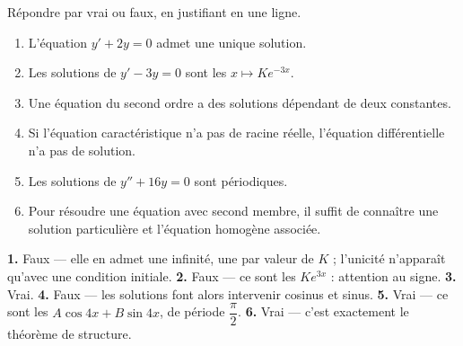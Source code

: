 \begin{jemeteste}
Répondre par vrai ou faux, en justifiant en une ligne.

\begin{enumerate}[label=\textbf{\arabic*.}, leftmargin=*, itemsep=0.28em]
  \item L'équation $y'+2y = 0$ admet une unique solution.
  \item Les solutions de $y'-3y=0$ sont les $x \mapsto Ke^{-3x}$.
  \item Une équation du second ordre a des solutions dépendant de deux
        constantes.
  \item Si l'équation caractéristique n'a pas de racine réelle, l'équation
        différentielle n'a pas de solution.
  \item Les solutions de $y''+16y = 0$ sont périodiques.
  \item Pour résoudre une équation avec second membre, il suffit de connaître
        une solution particulière et l'équation homogène associée.
\end{enumerate}
\end{jemeteste}

\begin{corrige}[je me teste]
\textbf{1.} Faux — elle en admet une infinité, une par valeur de $K$ ; l'unicité
n'apparaît qu'avec une condition initiale.
\textbf{2.} Faux — ce sont les $Ke^{3x}$ : attention au signe.
\textbf{3.} Vrai.
\textbf{4.} Faux — les solutions font alors intervenir cosinus et sinus.
\textbf{5.} Vrai — ce sont les $A\cos 4x + B\sin 4x$, de période
$\dfrac{\pi}{2}$.
\textbf{6.} Vrai — c'est exactement le théorème de structure.
\end{corrige}

